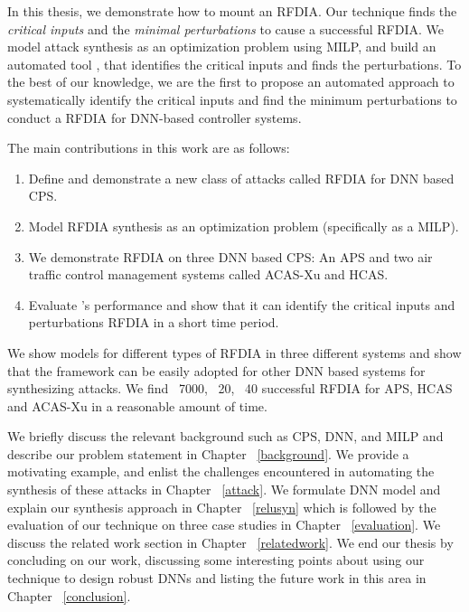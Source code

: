 In this thesis, we demonstrate how to mount an  \ac{RFDIA}.
Our technique finds the \textit{critical inputs} and the \textit{minimal perturbations} to cause a successful \ac{RFDIA}. 
We model attack synthesis as an optimization problem using \ac{MILP}, and build an automated tool \tool, that identifies the critical inputs and finds the perturbations.
To the best of our knowledge, we are the first to  propose an automated approach to systematically identify the critical inputs and find the minimum perturbations to conduct a \ac{RFDIA} for DNN-based controller systems.

The main contributions in this work are as follows:

\begin{enumerate}
	\item Define and demonstrate a new class of attacks called \ac{RFDIA} for \ac{DNN} based \ac{CPS}. 
	\item Model \ac{RFDIA} synthesis as an optimization problem (specifically as a \ac{MILP}). 
	\item We demonstrate \ac{RFDIA} on three \ac{DNN} based \ac{CPS}:  An \ac{APS} and two air traffic control management systems called \ac{ACAS-Xu} and \ac{HCAS}.
	\item Evaluate \tool's performance and show that it can identify the critical inputs and perturbations \ac{RFDIA} in a short time period.  
\end{enumerate}
 
We show models for different types of RFDIA in three different systems and show that the framework can be easily adopted for other \ac{DNN} based systems for synthesizing attacks. 
We find ~7000, ~20, ~40 successful \ac{RFDIA} for \ac{APS}, \ac{HCAS} and \ac{ACAS-Xu} in a reasonable amount of time. 

We briefly discuss the relevant background such as \ac{CPS}, \ac{DNN}, and \ac{MILP} and describe our problem statement in Chapter ~\ref{background}.
We provide a motivating example, and enlist the challenges encountered in automating the synthesis of these attacks in Chapter ~\ref{attack}.
We formulate \ac{DNN} model and explain our synthesis approach in Chapter ~\ref{relusyn} which is followed by the evaluation of our technique on three case studies in Chapter ~\ref{evaluation}.
We discuss the related work section in Chapter ~\ref{relatedwork}.
We end our thesis by concluding on our work, discussing some interesting points about using our technique to design robust \ac{DNN}s and listing the future work in this area in Chapter ~\ref{conclusion}.









